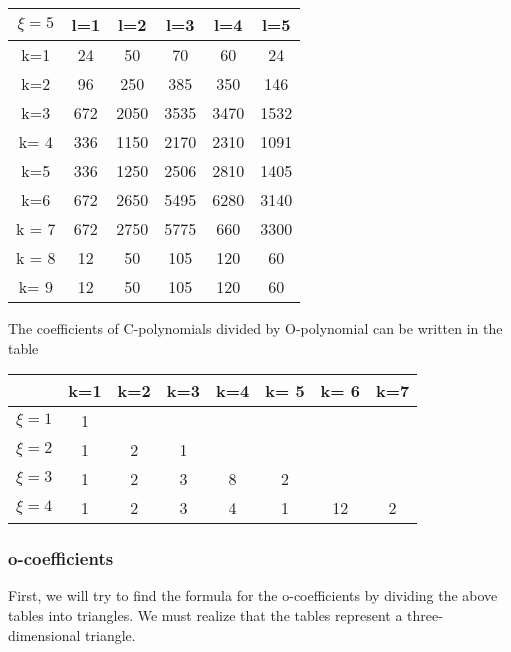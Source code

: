 \begin{table}[h!]
     \centering
     \begin{tabular}{||c| c c c c c ||} 
          \hline
          \hline
          \(\xi = 5\) & l=1 & l=2 & l=3 & l=4 & l=5 \\ [0.5ex] 
          \hline
          k=1 & 24 & 50 & 70 & 60 & 24 \\
          k=2 & 96 & 250 & 385 & 350 & 146 \\
          k=3 & 672 & 2050 & 3535 & 3470 & 1532 \\
          k= 4 & 336 & 1150 & 2170 & 2310 & 1091 \\
          k=5 & 336 & 1250 & 2506 & 2810 & 1405 \\
          k=6 & 672 & 2650 & 5495 & 6280 & 3140 \\
          k = 7 & 672 & 2750 & 5775 & 660 & 3300 \\
          k = 8 & 12 & 50 & 105 & 120 & 60 \\
          k= 9 & 12& 50 & 105 & 120 & 60 \\ [1ex] 
          \hline
          \hline
     \end{tabular}
\end{table}

\newpage

The coefficients of C-polynomials divided 
by O-polynomial can be written in the table

\begin{table}[h!]
     \centering
     \begin{tabular}{||c| c c c c c c c ||} 
          \hline
          \hline
          & k=1 & k=2 & k=3 & k=4 & k= 5 & k= 6 & k=7\\ [0.5ex] 
          \hline
          \(\xi = 1\) &1 & & && & & \\
          \(\xi=2\)   &1 & 2 & 1 & & & & \\
          \(\xi=3\) & 1 & 2 & 3 & 8 & 2 & & \\
          \(\xi=4\)  &1 & 2 & 3 & 4 & 1 & 12 & 2 \\ [1ex] 
          \hline
          \hline
     \end{tabular}
\end{table}

\subsubsection{o-coefficients}

First, we will try to find the formula for the o-coefficients 
by dividing the above tables into triangles. We must realize 
that the tables represent a three-dimensional triangle.

